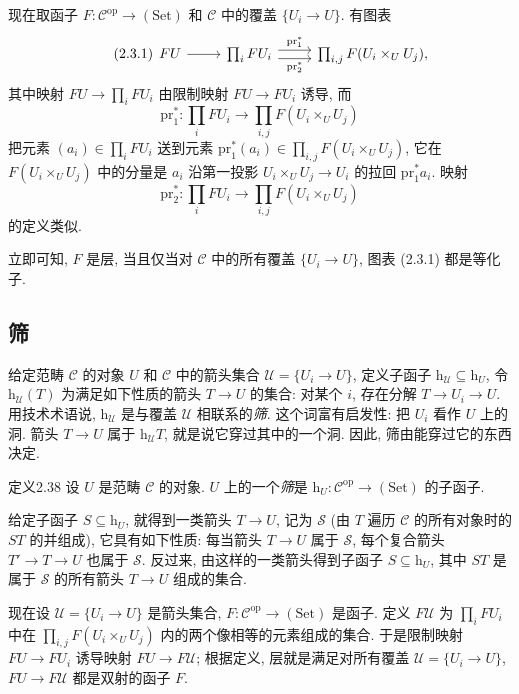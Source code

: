 现在取函子 $F:\mathcal C^{\mathrm{op}}\to(\mathrm{Set})$ 和 $\mathcal C$ 中的覆盖 $\{U_i\to U\}$. 有图表
\begin{equation}\tag{2.3.1}\label{ch02:eq231}
\begin{tikzcd}
FU\arrow[r]&\prod_iFU_i\arrow[r,shift left=.7ex,"\mathrm{pr}_1^*"]\arrow[r,shift right=.7ex,"\mathrm{pr}_2^*"']&\prod_{i,j}F(U_i\times_UU_j),
\end{tikzcd}
\end{equation}
其中映射 $FU\to\prod_iFU_i$ 由限制映射 $FU\to FU_i$ 诱导, 而
\[
\mathrm{pr}_1^*:\prod_iFU_i\longrightarrow\prod_{i,j}F(U_i\times_UU_j)
\]
把元素 $(a_i)\in\prod_iFU_i$ 送到元素 $\mathrm{pr}_1^*(a_i)\in\prod_{i,j}F(U_i\times_UU_j)$, 它在 $F(U_i\times_UU_j)$ 中的分量是 $a_i$ 沿第一投影 $U_i\times_UU_j\to U_i$ 的拉回 $\mathrm{pr}_1^*a_i$. 映射
\[
\mathrm{pr}_2^*:\prod_iFU_i\longrightarrow\prod_{i,j}F(U_i\times_UU_j)
\]
的定义类似.

立即可知, $F$ 是层, 当且仅当对 $\mathcal C$ 中的所有覆盖 $\{U_i\to U\}$, 图表 (2.3.1) 都是等化子.

\subsection{筛}\label{ch02:sec234}
给定范畴 $\mathcal C$ 的对象 $U$ 和 $\mathcal C$ 中的箭头集合 $\mathcal U=\{U_i\to U\}$, 定义子函子 $\mathrm h_{\mathcal U}\subseteq\mathrm h_U$, 令 $\mathrm h_{\mathcal U}(T)$ 为满足如下性质的箭头 $T\to U$ 的集合: 对某个 $i$, 存在分解 $T\to U_i\to U$. 用技术术语说, $\mathrm h_{\mathcal U}$ 是与覆盖 $\mathcal U$ 相联系的\emph{筛}. 这个词富有启发性: 把 $U_i$ 看作 $U$ 上的洞. 箭头 $T\to U$ 属于 $\mathrm h_{\mathcal U}T$, 就是说它穿过其中的一个洞. 因此, 筛由能穿过它的东西决定.

\begin{origstatement}{定义}{2.38}\label{ch02:def238}
设 $U$ 是范畴 $\mathcal C$ 的对象. $U$ 上的一个\emph{筛}是 $\mathrm h_U:\mathcal C^{\mathrm{op}}\to(\mathrm{Set})$ 的子函子.
\end{origstatement}

给定子函子 $S\subseteq\mathrm h_U$, 就得到一类箭头 $T\to U$, 记为 $\mathcal S$ (由 $T$ 遍历 $\mathcal C$ 的所有对象时的 $ST$ 的并组成), 它具有如下性质: 每当箭头 $T\to U$ 属于 $\mathcal S$, 每个复合箭头 $T'\to T\to U$ 也属于 $\mathcal S$. 反过来, 由这样的一类箭头得到子函子 $S\subseteq\mathrm h_U$, 其中 $ST$ 是属于 $\mathcal S$ 的所有箭头 $T\to U$ 组成的集合.

现在设 $\mathcal U=\{U_i\to U\}$ 是箭头集合, $F:\mathcal C^{\mathrm{op}}\to(\mathrm{Set})$ 是函子. 定义 $F\mathcal U$ 为 $\prod_iFU_i$ 中在 $\prod_{i,j}F(U_i\times_UU_j)$ 内的两个像相等的元素组成的集合. 于是限制映射 $FU\to FU_i$ 诱导映射 $FU\to F\mathcal U$; 根据定义, 层就是满足对所有覆盖 $\mathcal U=\{U_i\to U\}$, $FU\to F\mathcal U$ 都是双射的函子 $F$.

